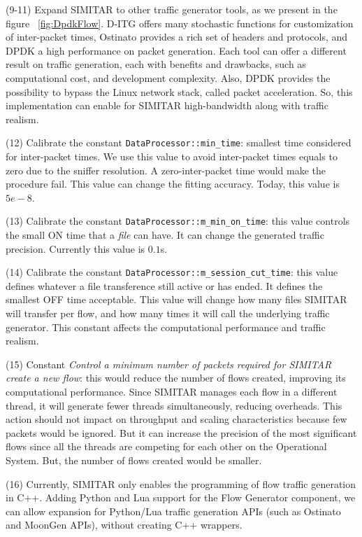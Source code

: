 (9-11) Expand SIMITAR to other traffic generator tools, as we present in the figure ~\ref{fig:DpdkFlow}. D-ITG offers many stochastic functions for customization of inter-packet times, Ostinato provides a rich set of headers and protocols, and DPDK a high performance on packet generation. Each tool can offer a different result on traffic generation, each with benefits and drawbacks, such as computational cost, and development complexity.  Also, DPDK provides the possibility to bypass the Linux network stack, called packet acceleration. So, this implementation can enable for SIMITAR high-bandwidth along with traffic realism.


(12) Calibrate  the constant  \texttt{DataProcessor::min\_time}: smallest time considered for inter-packet times. We use this value to avoid inter-packet times equals to zero due to the sniffer resolution. A zero-inter-packet time would make the procedure fail.  This value can change the fitting accuracy. Today, this value is $5e-8$.


(13) Calibrate  the constant \texttt{DataProcessor::m\_min\_on\_time}: this value controls the small ON time that a \textit{file} can have. It can change the generated traffic precision. Currently this value is $0.1$s. 


(14) Calibrate  the constant \texttt{DataProcessor::m\_session\_cut\_time}: this value defines whatever a file transference still active or has ended. It defines the smallest OFF time acceptable. This value will change how many files SIMITAR will transfer per flow, and how many times it will call the underlying traffic generator. This constant affects the computational performance and traffic realism.


(15) Constant \textit{Control a minimum number of packets required for SIMITAR create a new flow}: this would reduce the number of flows created, improving its computational performance. Since SIMITAR manages each flow in a different thread, it will generate fewer threads simultaneously, reducing overheads. This action should not impact on throughput and scaling characteristics because few packets would be ignored. But it can increase the precision of the most significant flows since all the threads are competing for each other on the Operational System. But, the number of flows created would be smaller.


(16) Currently, SIMITAR only enables the programming of flow traffic generation in C++. Adding Python and Lua support for the Flow Generator component, we can allow expansion for Python/Lua traffic generation APIs (such as Ostinato and MoonGen APIs), without creating C++ wrappers.


